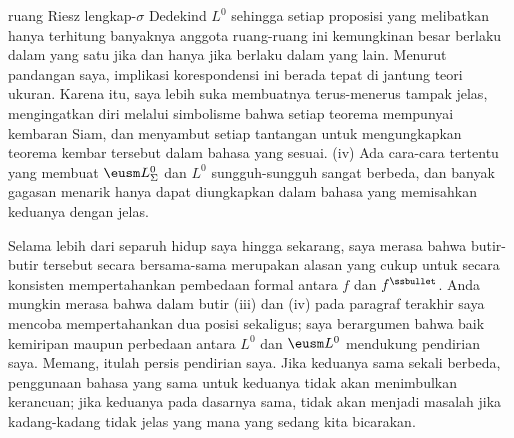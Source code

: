 {ruang Riesz lengkap-$\sigma$ Dedekind $L^0$ sehingga setiap proposisi yang
melibatkan hanya terhitung banyaknya anggota ruang-ruang ini kemungkinan
besar berlaku dalam yang satu jika dan hanya jika berlaku dalam yang lain.
Menurut pandangan saya, implikasi korespondensi ini berada tepat di jantung
teori ukuran. Karena itu, saya lebih suka membuatnya terus-menerus tampak
jelas, mengingatkan diri melalui simbolisme bahwa setiap teorema mempunyai
kembaran Siam, dan menyambut setiap tantangan untuk mengungkapkan teorema
kembar tersebut dalam bahasa yang sesuai. (iv) Ada cara-cara tertentu yang
membuat $\eusm L^0_{\Sigma}$ dan $L^0$ sungguh-sungguh sangat berbeda, dan
banyak gagasan menarik hanya dapat diungkapkan dalam bahasa yang memisahkan
keduanya dengan jelas.

Selama lebih dari separuh hidup saya hingga sekarang, saya merasa bahwa
butir-butir tersebut secara bersama-sama merupakan alasan yang cukup untuk
secara konsisten mempertahankan pembedaan formal antara $f$ dan
$f^{\ssbullet}$. Anda mungkin merasa bahwa dalam butir (iii) dan (iv) pada
paragraf terakhir saya mencoba mempertahankan dua posisi sekaligus; saya
berargumen bahwa baik kemiripan maupun perbedaan antara $L^0$ dan
$\eusm L^0$ mendukung pendirian saya. Memang, itulah persis pendirian saya.
Jika keduanya sama sekali berbeda, penggunaan bahasa yang sama untuk
keduanya tidak akan menimbulkan kerancuan; jika keduanya pada dasarnya sama,
tidak akan menjadi masalah jika kadang-kadang tidak jelas yang mana yang
sedang kita bicarakan.
}%

\discrpage

